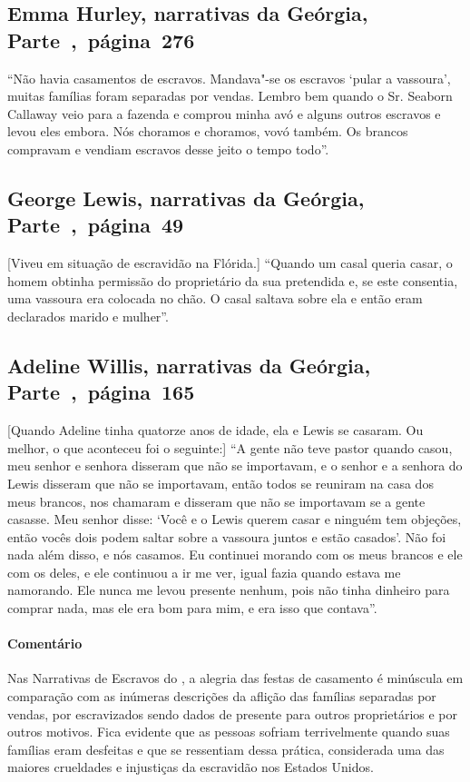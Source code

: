 \subsection{Emma Hurley, narrativas da Geórgia, Parte~,~página~276}
\label{ref158}

``Não havia casamentos de escravos. Mandava"-se os escravos `pular a
vassoura', muitas famílias foram separadas por vendas. Lembro bem
quando o Sr. Seaborn Callaway veio para a fazenda e comprou minha avó e
alguns outros escravos e levou eles embora. Nós choramos e choramos,
vovó também. Os brancos compravam e vendiam escravos desse jeito o tempo
todo''.

\subsection{George Lewis, narrativas da Geórgia, Parte~,~página~49}
\label{ref172}

{[}Viveu em situação de escravidão na Flórida.{]} ``Quando um casal queria casar, o homem obtinha permissão do
proprietário da sua pretendida e, se este consentia, uma vassoura era
colocada no chão. O casal saltava sobre ela e então eram declarados
marido e mulher''.

\subsection{Adeline Willis, narrativas da Geórgia, Parte~,~página~165}
\label{ref298}

{[}Quando Adeline tinha quatorze anos de idade, ela e Lewis se casaram. Ou melhor, o que aconteceu foi o seguinte:{]} ``A gente não teve pastor quando
casou, meu senhor e senhora disseram que não se importavam, e o senhor e
a senhora do Lewis disseram que não se importavam, então todos se
reuniram na casa dos meus brancos, nos chamaram e disseram que não se
importavam se a gente casasse. Meu senhor disse: `Você e o Lewis querem
casar e ninguém tem objeções, então vocês dois podem saltar sobre a
vassoura juntos e estão casados'. Não foi nada além disso, e nós
casamos. Eu continuei morando com os meus brancos e ele com os deles, e
ele continuou a ir me ver, igual fazia quando estava me namorando. Ele
nunca me levou presente nenhum, pois não tinha dinheiro para comprar
nada, mas ele era bom para mim, e era isso que contava''.

\paragraph{Comentário}\quad
{\small
Nas Narrativas de Escravos do , a alegria das festas de
casamento é minúscula em comparação com as inúmeras descrições da
aflição das famílias separadas por vendas, por escravizados sendo dados de
presente para outros proprietários e por outros motivos. Fica evidente
que as pessoas sofriam terrivelmente quando suas famílias eram
desfeitas e que se ressentiam dessa prática, considerada uma das maiores
crueldades e injustiças da escravidão nos Estados Unidos.
}

